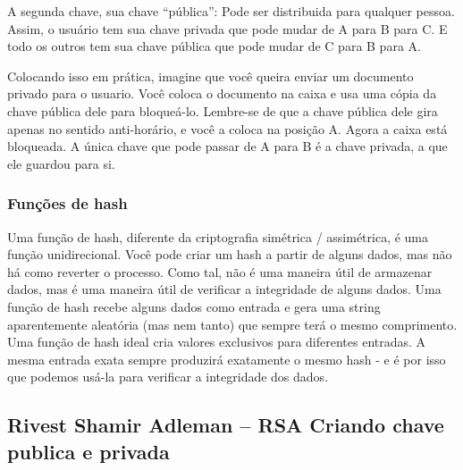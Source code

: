 A segunda chave, sua chave “pública”: Pode ser distribuida para qualquer pessoa. Assim, o usuário tem sua chave privada que pode mudar de A para B para C. E todo os outros tem sua chave pública que pode mudar de C para B para A.

Colocando isso em prática, imagine que você queira enviar um documento privado para o usuario. Você coloca o documento na caixa e usa uma cópia da chave pública dele para bloqueá-lo. Lembre-se de que a chave pública dele gira apenas no sentido anti-horário, e você a coloca na posição A. Agora a caixa está bloqueada. A única chave que pode passar de A para B é a chave privada, a que ele guardou para si.

\subsubsection{Funções de hash}
Uma função de hash, diferente da criptografia simétrica / assimétrica, é uma função unidirecional. Você pode criar um hash a partir de alguns dados, mas não há como reverter o processo. Como tal, não é uma maneira útil de armazenar dados, mas é uma maneira útil de verificar a integridade de alguns dados.
Uma função de hash recebe alguns dados como entrada e gera uma string aparentemente aleatória (mas nem tanto) que sempre terá o mesmo comprimento. Uma função de hash ideal cria valores exclusivos para diferentes entradas. A mesma entrada exata sempre produzirá exatamente o mesmo hash - e é por isso que podemos usá-la para verificar a integridade dos dados.

\subsection{Rivest Shamir Adleman – RSA Criando chave publica e privada}


